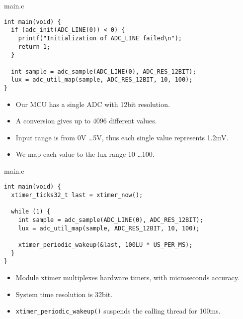 \documentclass[aspectratio=169]{beamer}
\begin{document}
\begin{frame}[fragile]{}

\begin{exampleblock}{main.c}
\begin{verbatim}
int main(void) {
  if (adc_init(ADC_LINE(0)) < 0) {
    printf("Initialization of ADC_LINE failed\n");
    return 1;
  }
        
  int sample = adc_sample(ADC_LINE(0), ADC_RES_12BIT);   
  lux = adc_util_map(sample, ADC_RES_12BIT, 10, 100);
}
\end{verbatim}
\end{exampleblock}

\begin{itemize}

\item Our MCU has a single ADC with 12bit resolution.

\item A conversion gives up to 4096 different values.

\item Input range is from 0V \ldots 5V, thus each single value represents 1.2mV.

\item We map each value to the lux range 10 \ldots 100.

\end{itemize}

\vspace{2cm}
\end{frame}



\begin{frame}[fragile]{}

\begin{exampleblock}{main.c}
\begin{verbatim}
int main(void) {
  xtimer_ticks32_t last = xtimer_now();

  while (1) {  
    int sample = adc_sample(ADC_LINE(0), ADC_RES_12BIT);   
    lux = adc_util_map(sample, ADC_RES_12BIT, 10, 100);
    
    xtimer_periodic_wakeup(&last, 100LU * US_PER_MS);
  }
}
\end{verbatim}
\end{exampleblock}

\begin{itemize}

\item Module xtimer multiplexes hardware timers, with microseconds accuracy.

\item System time resolution is 32bit.

\item \texttt{xtimer_periodic_wakeup()} suspends the calling thread for 100ms.

\end{itemize}

\vspace{2cm}
\end{frame}
\end{document}

